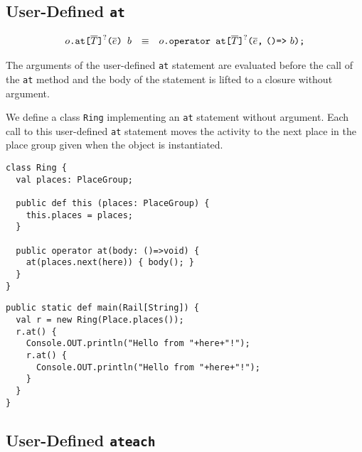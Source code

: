 \subsection{User-Defined \texttt{at}}

$$
\begin{array}{rcl}
  {o}\texttt{.at}\texttt{[}{\overline{T}}\texttt{]}^?\texttt{(}{\overline{e}}\texttt{)~}{b}
  & \equiv &
  {o}\texttt{.operator~at}\texttt{[}{\overline{T}}\texttt{]}^?\texttt{(} {\overline{e}}\texttt{,}~ \texttt{()=>}~{b}\texttt{);}
\end{array}
$$

The arguments of the user-defined \verb+at+ statement are evaluated
before the call of the \verb+at+ method and the body of the statement
is lifted to a closure without argument.


\begin{example}
  We define a class \verb+Ring+ implementing an \verb+at+ statement
  without argument. Each call to this user-defined \verb+at+ statement
  moves the activity to the next place in the place group given when
  the object is instantiated.
\begin{verbatim}
class Ring {
  val places: PlaceGroup;

  public def this (places: PlaceGroup) {
    this.places = places;
  }

  public operator at(body: ()=>void) {
    at(places.next(here)) { body(); }
  }
}
\end{verbatim}

\begin{verbatim}
public static def main(Rail[String]) {
  val r = new Ring(Place.places());
  r.at() {
    Console.OUT.println("Hello from "+here+"!");
    r.at() {
      Console.OUT.println("Hello from "+here+"!");
    }
  }
}
\end{verbatim}
\end{example}


\subsection{User-Defined \texttt{ateach}}

